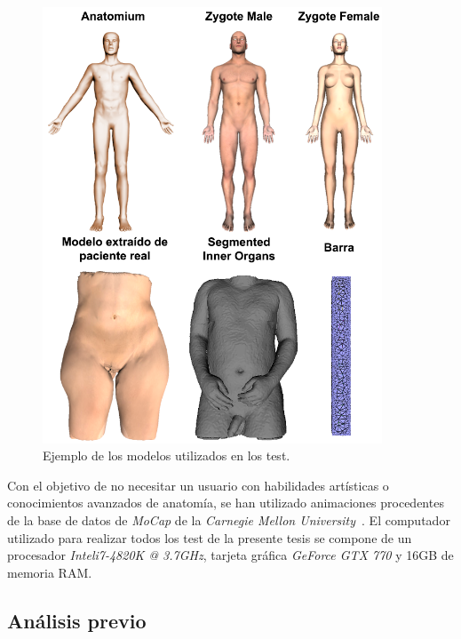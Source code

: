 \begin{figure}[ht]%
  \centering
  \includegraphics[width=0.90\textwidth]{IMG/modelos}
    \caption{Ejemplo de los modelos utilizados en los test.}
    \label{fig:models}
\end{figure}


Con el objetivo de no necesitar un usuario con habilidades artísticas o conocimientos avanzados de anatomía, se han utilizado animaciones procedentes de la base de datos de \emph{\ac{MoCap}} de la \emph{Carnegie Mellon University}~\cite{CMUMCD}. El computador utilizado para realizar todos los test de la presente tesis se compone de un procesador \emph{Intel\textregistered i7-4820K @ 3.7GHz}, tarjeta gráfica \emph{GeForce GTX 770} y 16GB de memoria \acs{RAM}.
\clearpage

\subsection{Análisis previo}
\label{sec:ana_prev}


